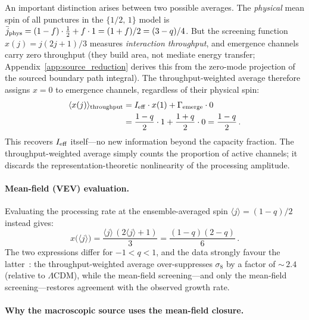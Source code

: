 \documentclass[aps,prd,twocolumn,10pt,superscriptaddress,nofootinbib]{revtex4-2}
\begin{document}
An important distinction arises between two possible averages.
The \emph{physical} mean spin of all punctures in the
$\{1/2,\,1\}$ model is
$\bar{j}_{\rm phys} = (1-f)\cdot\tfrac{1}{2} + f\cdot 1
= (1+f)/2 = (3-q)/4$.  But the screening function
$x(j) = j(2j+1)/3$ measures \emph{interaction throughput}, and
emergence channels carry zero throughput (they build area, not
mediate energy transfer; Appendix~\ref{app:source_reduction} derives
this from the zero-mode projection of the sourced boundary path
integral).  The throughput-weighted average
therefore assigns $x = 0$ to emergence channels, regardless of
their physical spin:
\begin{align}
\langle x(j) \rangle_{\rm throughput}
  &= I_{\rm eff} \cdot x(1) + \Gamma_{\rm emerge} \cdot 0
\nonumber \\
  &= \frac{1-q}{2} \cdot 1 + \frac{1+q}{2} \cdot 0
  = \frac{1-q}{2}\,.
\label{eq:x_exact}
\end{align}
This recovers $I_{\rm eff}$ itself---no new information beyond
the capacity fraction.  The throughput-weighted average simply
counts the proportion of active channels; it discards the
representation-theoretic nonlinearity of the processing amplitude.

\paragraph{Mean-field (VEV) evaluation.}

Evaluating the processing rate at the ensemble-averaged spin
$\langle j \rangle = (1-q)/2$ instead gives:
\begin{equation}
x\bigl(\langle j \rangle\bigr)
  = \frac{\langle j \rangle\,(2\langle j \rangle + 1)}{3}
  = \frac{(1-q)(2-q)}{6}\,.
\label{eq:x_meanfield}
\end{equation}
The two expressions differ for $-1 < q < 1$, and the data
strongly favour the latter~\cite{Sayegh2026}: the
throughput-weighted average over-suppresses $\sigma_8$ by a
factor of ${\sim}\,2.4$ (relative to $\Lambda$CDM), while the
mean-field screening---and only the mean-field
screening---restores agreement with the observed growth rate.

\paragraph{Why the macroscopic source uses the mean-field closure.}
\end{document}
